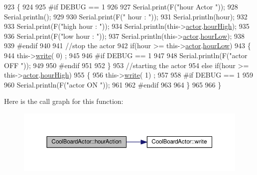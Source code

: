 \begin{DoxyCode}
923 \{
924 
925 \textcolor{preprocessor}{#if DEBUG == 1}
926     
927     Serial.print(F(\textcolor{stringliteral}{"hour Actor "}));
928     Serial.println();
929 
930     Serial.print(F(\textcolor{stringliteral}{" hour : "}));
931     Serial.println(hour);
932 
933     Serial.print(F(\textcolor{stringliteral}{"high hour : "}));
934     Serial.println(this->\hyperlink{class_cool_board_actor_a8f190db9f7a39fddbcef7f152da970e9}{actor}.\hyperlink{struct_cool_board_actor_1_1state_acd1af3ac2382258a5b05497d814adc01}{hourHigh});
935 
936     Serial.print(F(\textcolor{stringliteral}{"low hour : "}));
937     Serial.println(this->\hyperlink{class_cool_board_actor_a8f190db9f7a39fddbcef7f152da970e9}{actor}.\hyperlink{struct_cool_board_actor_1_1state_ae7034bf95b36f1392f9de076fa0c8c0f}{hourLow});
938 
939 \textcolor{preprocessor}{#endif}
940 
941     \textcolor{comment}{//stop the actor    }
942     \textcolor{keywordflow}{if}(hour >= this->\hyperlink{class_cool_board_actor_a8f190db9f7a39fddbcef7f152da970e9}{actor}.\hyperlink{struct_cool_board_actor_1_1state_ae7034bf95b36f1392f9de076fa0c8c0f}{hourLow})
943     \{
944         this->\hyperlink{class_cool_board_actor_a958786ff01ea1056ee72c72d439f86da}{write}( 0) ;
945 
946 \textcolor{preprocessor}{    #if DEBUG == 1 }
947 
948         Serial.println(F(\textcolor{stringliteral}{"actor OFF "}));
949 
950 \textcolor{preprocessor}{    #endif  }
951 
952     \}
953     \textcolor{comment}{//starting the actor}
954     \textcolor{keywordflow}{else} \textcolor{keywordflow}{if}(hour >= this->\hyperlink{class_cool_board_actor_a8f190db9f7a39fddbcef7f152da970e9}{actor}.\hyperlink{struct_cool_board_actor_1_1state_acd1af3ac2382258a5b05497d814adc01}{hourHigh})
955     \{
956         this->\hyperlink{class_cool_board_actor_a958786ff01ea1056ee72c72d439f86da}{write}( 1) ;
957 
958 \textcolor{preprocessor}{    #if DEBUG == 1 }
959 
960         Serial.println(F(\textcolor{stringliteral}{"actor ON "}));
961 
962 \textcolor{preprocessor}{    #endif  }
963     
964     \}
965 
966 \}
\end{DoxyCode}
Here is the call graph for this function\+:\nopagebreak
\begin{figure}[H]
\begin{center}
\leavevmode
\includegraphics[width=350pt]{dc/d69/class_cool_board_actor_adf3b4e15b9d73681082112adf8ef95cb_cgraph}
\end{center}
\end{figure}

